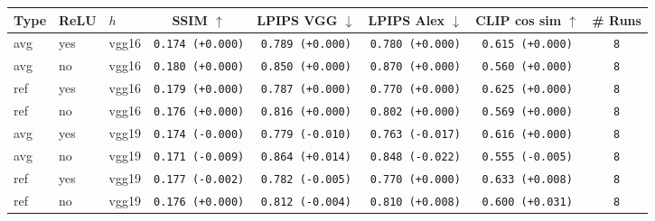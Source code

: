 \begin{tabular}{|l|l|l|c|c|c|c|c|}
\hline
Type & ReLU & $h$ & SSIM $\uparrow$ & LPIPS VGG $\downarrow$ & LPIPS Alex $\downarrow$ & CLIP cos sim $\uparrow$ & \# Runs \\
\hline
\rowcolor{verylightgray}avg & yes & vgg16 & \texttt{0.174 {\color{black}(+0.000)}} & \texttt{0.789 {\color{black}(+0.000)}} & \texttt{0.780 {\color{black}(+0.000)}} & \texttt{0.615 {\color{black}(+0.000)}} & \texttt{8} \\
\rowcolor{verylightgray}avg & no & vgg16 & \texttt{0.180 {\color{black}(+0.000)}} & \texttt{0.850 {\color{black}(+0.000)}} & \texttt{0.870 {\color{black}(+0.000)}} & \texttt{0.560 {\color{black}(+0.000)}} & \texttt{8} \\
\rowcolor{verylightgray}ref & yes & vgg16 & \texttt{0.179 {\color{black}(+0.000)}} & \texttt{0.787 {\color{black}(+0.000)}} & \texttt{0.770 {\color{black}(+0.000)}} & \texttt{0.625 {\color{black}(+0.000)}} & \texttt{8} \\
\rowcolor{verylightgray}ref & no & vgg16 & \texttt{0.176 {\color{black}(+0.000)}} & \texttt{0.816 {\color{black}(+0.000)}} & \texttt{0.802 {\color{black}(+0.000)}} & \texttt{0.569 {\color{black}(+0.000)}} & \texttt{8} \\
\hline
avg & yes & vgg19 & \texttt{0.174 {\color{black}(-0.000)}} & \texttt{0.779 {\color{green}(-0.010)}} & \texttt{0.763 {\color{green}(-0.017)}} & \texttt{0.616 {\color{black}(+0.000)}} & \texttt{8} \\
avg & no & vgg19 & \texttt{0.171 {\color{red}(-0.009)}} & \texttt{0.864 {\color{red}(+0.014)}} & \texttt{0.848 {\color{green}(-0.022)}} & \texttt{0.555 {\color{red}(-0.005)}} & \texttt{8} \\
ref & yes & vgg19 & \texttt{0.177 {\color{red}(-0.002)}} & \texttt{0.782 {\color{green}(-0.005)}} & \texttt{0.770 {\color{black}(+0.000)}} & \texttt{0.633 {\color{green}(+0.008)}} & \texttt{8} \\
ref & no & vgg19 & \texttt{0.176 {\color{black}(+0.000)}} & \texttt{0.812 {\color{green}(-0.004)}} & \texttt{0.810 {\color{red}(+0.008)}} & \texttt{0.600 {\color{green}(+0.031)}} & \texttt{8} \\
\hline
\end{tabular}

